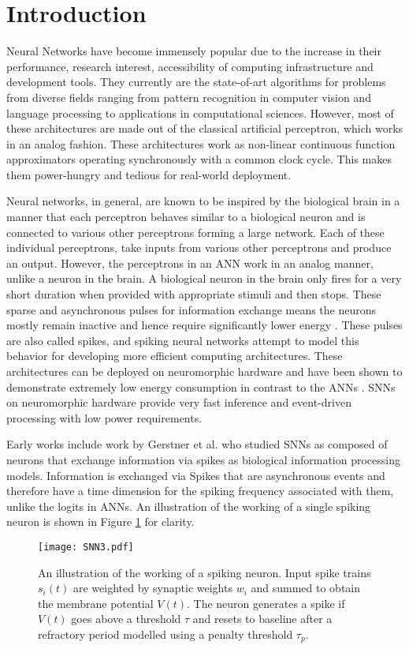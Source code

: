 \documentclass{article}
\begin{document}
\section{Introduction}
Neural Networks have become immensely popular due to the increase in their performance, research interest, accessibility of computing infrastructure and development tools. They currently are the state-of-art algorithms for problems from diverse fields ranging from pattern recognition in computer vision and language processing to applications in computational sciences. However, most of these architectures are made out of the classical artificial perceptron, which works in an analog fashion. These architectures work as non-linear continuous function approximators operating synchronously with a common clock cycle. This makes them power-hungry and tedious for real-world deployment.

Neural networks, in general, are known to be inspired by the biological brain in a manner that each perceptron behaves similar to a biological neuron and is connected to various other perceptrons forming a large network. Each of these individual perceptrons, take inputs from various other perceptrons and produce an output. However, the perceptrons in an ANN work in an analog manner, unlike a neuron in the brain. A biological neuron in the brain only fires for a very short duration when provided with appropriate stimuli and then stops. These sparse and asynchronous pulses for information exchange means the neurons mostly remain inactive and hence require significantly lower energy \cite{paugam2012computing}. These pulses are also called spikes, and spiking neural networks attempt to model this behavior for developing more efficient computing architectures. These architectures can be deployed on neuromorphic hardware and have been shown to demonstrate extremely low energy consumption in contrast to the ANNs \cite{diamond2016comparing}. SNNs on neuromorphic hardware provide very fast inference and event-driven processing with low power requirements.

Early works include work by Gerstner et al. \cite{gerstner2002spiking} who studied SNNs as composed of neurons that exchange information via spikes as biological information processing models. Information is exchanged via Spikes that are asynchronous events and therefore have a time dimension for the spiking frequency associated with them, unlike the logits in ANNs. An illustration of the working of a single spiking neuron is shown in Figure \ref{fig:spikingNeuron} for clarity.
\begin{figure}
    \centering
    \texttt{[image: SNN3.pdf]}
    \caption{An illustration of the working of a spiking neuron. Input spike trains $s_i(t)$ are weighted by synaptic weights $w_i$ and summed to obtain the membrane potential $V(t)$. The neuron generates a spike if $V(t)$ goes above a threshold $\tau$ and resets to baseline after a refractory period modelled using a penalty threshold $\tau_p$.}
    \vspace{-6mm}
    \label{fig:spikingNeuron}
\end{figure}
\end{document}
